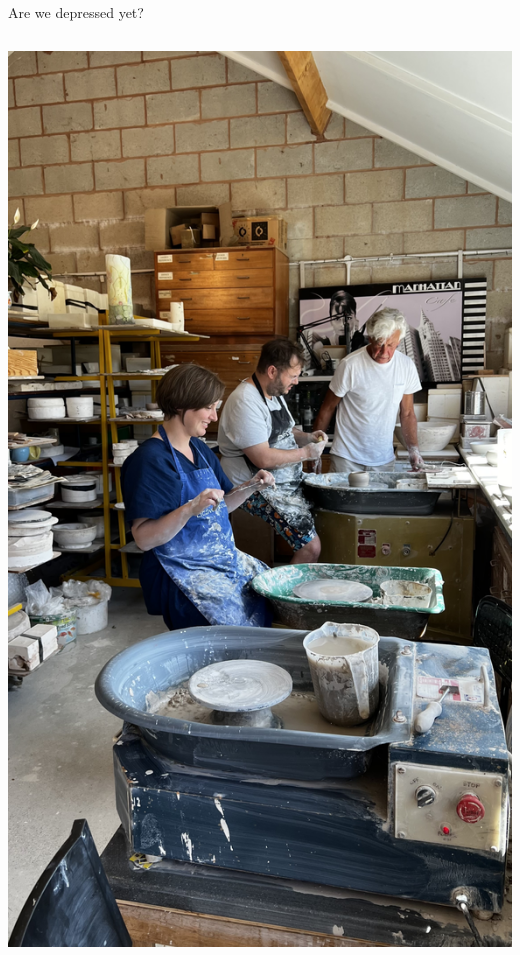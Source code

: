 \documentclass[9pt,aspectratio=169]{beamer}
\begin{document}
\begin{frame}[label={sec:org07a23c0}]{Are we depressed yet?}
\begin{columns}
\begin{column}[t]{0.4\columnwidth}
\begin{center}
\includegraphics[width=\linewidth]{./pottery.jpeg}
\end{center}
\end{column}
\end{columns}
\end{frame}
\end{document}
